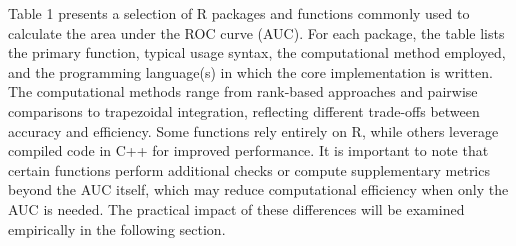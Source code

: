 Table 1 presents a selection of R packages and functions commonly used
to calculate the area under the ROC curve (AUC). For each package, the
table lists the primary function, typical usage syntax, the
computational method employed, and the programming language(s) in which
the core implementation is written. The computational methods range from
rank-based approaches and pairwise comparisons to trapezoidal
integration, reflecting different trade-offs between accuracy and
efficiency. Some functions rely entirely on R, while others leverage
compiled code in C++ for improved performance. It is important to note
that certain functions perform additional checks or compute
supplementary metrics beyond the AUC itself, which may reduce
computational efficiency when only the AUC is needed. The practical
impact of these differences will be examined empirically in the
following section.

